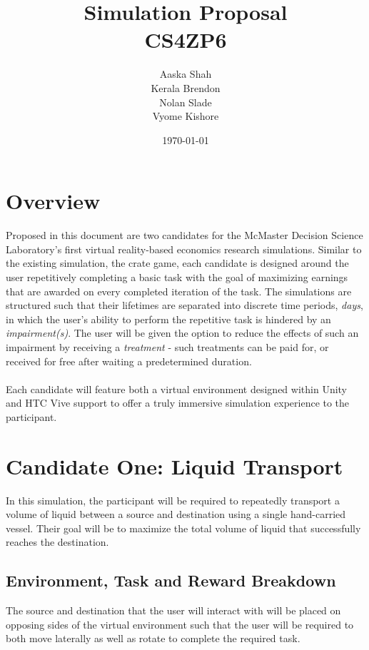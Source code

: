 \documentclass{article}
\title{\textbf{Simulation Proposal}\\CS4ZP6}
\author{Aaska Shah\\Kerala Brendon\\Nolan Slade\\Vyome Kishore}
\date{\today}
\begin{document}
\maketitle

\section*{Overview}

Proposed in this document are two candidates for the McMaster Decision Science Laboratory's first virtual reality-based economics research simulations. Similar to the existing simulation, the crate game, each candidate is designed around the user repetitively completing a basic task with the goal of maximizing earnings that are awarded on every completed iteration of the task. The simulations are structured such that their lifetimes are separated into discrete time periods, \textit{days}, in which the user's ability to perform the repetitive task is hindered by an \textit{impairment(s)}. The user will be given the option to reduce the effects of such an impairment by receiving a \textit{treatment} - such treatments can be paid for, or received for free after waiting a predetermined duration.
\\
\\
Each candidate will feature both a virtual environment designed within Unity and HTC Vive support to offer a truly immersive simulation experience to the participant.


\section*{Candidate One: Liquid Transport}

In this simulation, the participant will be required to repeatedly transport a volume of liquid between a source and destination using a single hand-carried vessel. Their goal will be to maximize the total volume of liquid that successfully reaches the destination.


\subsection*{Environment, Task and Reward Breakdown}

The source and destination that the user will interact with will be placed on opposing sides of the virtual environment such that the user will be required to both move laterally as well as rotate to complete the required task.
\end{document}
